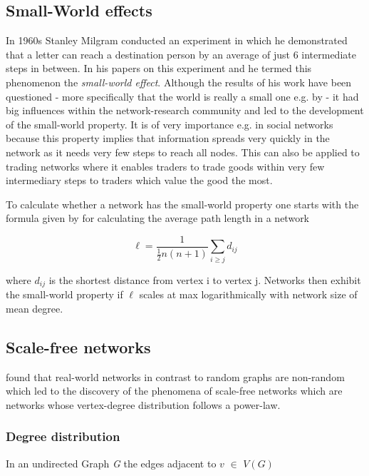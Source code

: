 \documentclass[../Bachelorarbeit.tex]{subfiles}
\begin{document}
\subsection{Small-World effects}
In 1960s Stanley Milgram conducted an experiment in which he demonstrated that a letter can reach a destination person by an average of just 6 intermediate steps in between. In his papers on this experiment \cite{TraverMilgram_StudySmallWorld} and \cite{Milgram_SmallWorld} he termed this phenomenon the \textit{small-world effect}. Although the results of his work have been questioned - more specifically that the world is really a small one e.g. by \cite{Kleinfeld_BigWorld} - it had big influences within the network-research community and led to the development of the small-world property. It is of very importance e.g. in social networks because this property implies that information spreads very quickly in the network as it needs very few steps to reach all nodes. This can also be applied to trading networks where it enables traders to trade goods within very few intermediary steps to traders which value the good the most.

\medskip

To calculate whether a network has the small-world property one starts with the formula given by \cite{Newman_ComplexNetworks} for calculating the average path length in a network

\begin{equation}
\ell = \frac{1}{\frac{1}{2}n(n+1)} \displaystyle\sum_{i \geq j }^{} d_{ij}
\end{equation}

where $d_{ij}$ is the shortest distance from vertex i to vertex j. Networks then exhibit the small-world property if $\ell$ scales at max logarithmically with network size of mean degree.

\subsection{Scale-free networks}
\cite{BarabasiAlbert_EmergenceScaling} found that real-world networks in contrast to random graphs are non-random which led to the discovery of the phenomena of scale-free networks which are networks whose vertex-degree distribution follows a power-law.

\subsubsection{Degree distribution}
In an undirected Graph \textit{G} the edges adjacent to $v$ $\in$ $V(G)$ 
\end{document}
